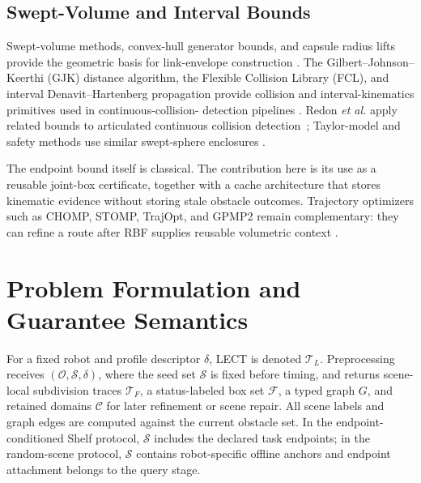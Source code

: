 \documentclass[journal]{IEEEtran}
\newcommand{\rbf}{RBF}
\newcommand{\calO}{\ensuremath{\mathcal{O}}}
\newcommand{\etal}{\textit{et al.}}
\begin{document}
\subsection{Swept-Volume and Interval Bounds}
Swept-volume methods, convex-hull generator bounds, and capsule radius lifts
provide the geometric basis for link-envelope construction
\cite{blackmore1992swept,abdel2006swept,gottschalk1996obbtree,larsen1999fast}.
The Gilbert--Johnson--Keerthi (GJK) distance algorithm, the Flexible
Collision Library (FCL), and interval Denavit--Hartenberg propagation provide
collision and interval-kinematics primitives used in continuous-collision-
detection pipelines \cite{gilbert1988fast,bergen1999gjk,pan2012fcl,moore2009introduction,
jaulin2001applied,snyder1992interval,merlet2004solving,
merlet2009interval}. Redon \etal{} apply related bounds to articulated
continuous collision detection~\cite{redon2004ccd_avatar,redon2005fast_artic};
Taylor-model and safety methods use similar swept-sphere enclosures
\cite{zhang2007taylor,schwarzer2005adaptive,corrales2011ssl}.

The endpoint bound itself is classical. The contribution here is its use as a
reusable joint-box certificate, together with a cache architecture that stores
kinematic evidence without storing stale obstacle outcomes. Trajectory
optimizers such as CHOMP, STOMP, TrajOpt, and GPMP2 remain complementary: they
can refine a route after \rbf{} supplies reusable volumetric context
\cite{ratliff2009chomp,kalakrishnan2011stomp,schulman2014motion,
mukadam2018gpmp2}.

\FloatBarrier
\section{Problem Formulation and Guarantee Semantics}\label{sec:overview_scope}

For a fixed robot and profile descriptor $\delta$, LECT is denoted
$\mathcal{T}_L$. Preprocessing receives $(\calO,\mathcal{S},\delta)$, where the
seed set $\mathcal{S}$ is fixed before timing, and returns scene-local
subdivision traces $\mathcal{T}_F$, a status-labeled box set $\mathcal{F}$, a
typed graph $G$, and retained domains $\mathcal{C}$ for later refinement or
scene repair. All scene labels and graph edges are computed against the current
obstacle set. In the endpoint-conditioned Shelf protocol, $\mathcal{S}$ includes
the declared task endpoints; in the random-scene protocol, $\mathcal{S}$ contains
robot-specific offline anchors and endpoint attachment belongs to the query
stage.
\end{document}
